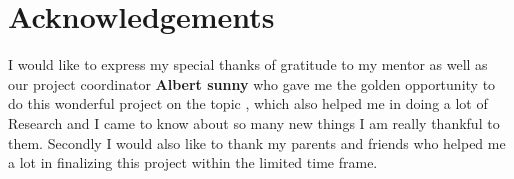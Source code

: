 \chapter*{\centering Acknowledgements}
\quad I would like to express my special thanks of gratitude to my mentor \textbf{\the\guide} as well as our project coordinator \textbf{Albert sunny} who gave me the golden opportunity to do this wonderful project on the topic \textbf{\the\btptitle}, which also helped me in doing a lot of Research and I came to know about so many new things I am really thankful to them.
Secondly I would also like to thank my parents and friends who helped me a lot in finalizing this project within the limited time frame.

